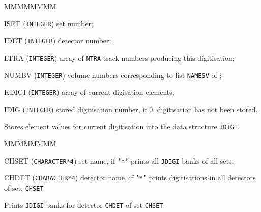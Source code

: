        
       


\begin{DLtt}{MMMMMMMM}
\item[ISET] ({\tt INTEGER}) set number;
\item[IDET] ({\tt INTEGER}) detector number;
\item[LTRA] ({\tt INTEGER}) array of {\tt NTRA} track numbers producing 
this digitisation;
\item[NUMBV] ({\tt INTEGER}) volume numbers corresponding to list {\tt NAMESV} 
of ;
\item[KDIGI] ({\tt INTEGER}) array of current digisation elements;
\item[IDIG] ({\tt INTEGER}) stored digitisation number, if 0, digitisation 
has not been stored.
\end{DLtt}
Stores element values for current digitisation
into the data structure {\tt JDIGI}.

\begin{DLtt}{MMMMMMMM}
\item[CHSET] ({\tt CHARACTER*4}) set name,
if {\tt '*'} prints all {\tt JDIGI} banks of all sets;
\item[CHDET] ({\tt CHARACTER*4}) detector name, if {\tt '*'} prints 
digitisations in all detectors of set;
{\tt CHSET}
\end{DLtt}
Prints {\tt JDIGI} banks for detector {\tt CHDET} of set {\tt CHSET}.
 

